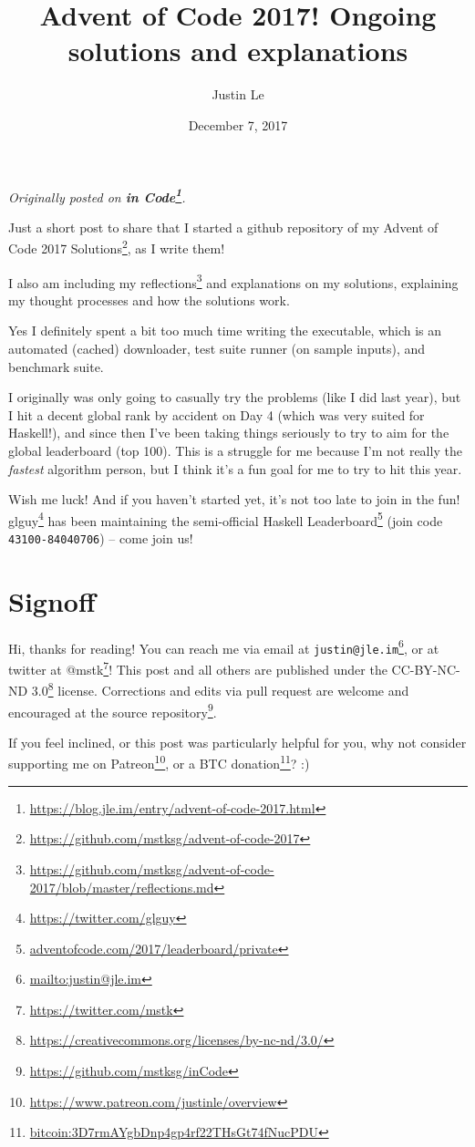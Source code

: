 \documentclass[]{article}
\title{Advent of Code 2017! Ongoing solutions and explanations}
\author{Justin Le}
\date{December 7, 2017}
\renewcommand{\href}[2]{#2\footnote{\url{#1}}}
\begin{document}
\maketitle

\emph{Originally posted on
\textbf{\href{https://blog.jle.im/entry/advent-of-code-2017.html}{in Code}}.}

Just a short post to share that I started a github repository of my
\href{https://github.com/mstksg/advent-of-code-2017}{Advent of Code 2017
Solutions}, as I write them!

I also am including my
\href{https://github.com/mstksg/advent-of-code-2017/blob/master/reflections.md}{reflections}
and explanations on my solutions, explaining my thought processes and how the
solutions work.

Yes I definitely spent a bit too much time writing the executable, which is an
automated (cached) downloader, test suite runner (on sample inputs), and
benchmark suite.

I originally was only going to casually try the problems (like I did last year),
but I hit a decent global rank by accident on Day 4 (which was very suited for
Haskell!), and since then I've been taking things seriously to try to aim for
the global leaderboard (top 100). This is a struggle for me because I'm not
really the \emph{fastest} algorithm person, but I think it's a fun goal for me
to try to hit this year.

Wish me luck! And if you haven't started yet, it's not too late to join in the
fun! \href{https://twitter.com/glguy}{glguy} has been maintaining the
semi-official \href{adventofcode.com/2017/leaderboard/private}{Haskell
Leaderboard} (join code \texttt{43100-84040706}) -- come join us!

\hypertarget{signoff}{%
\section{Signoff}\label{signoff}}

Hi, thanks for reading! You can reach me via email at
\href{mailto:justin@jle.im}{\nolinkurl{justin@jle.im}}, or at twitter at
\href{https://twitter.com/mstk}{@mstk}! This post and all others are published
under the \href{https://creativecommons.org/licenses/by-nc-nd/3.0/}{CC-BY-NC-ND
3.0} license. Corrections and edits via pull request are welcome and encouraged
at \href{https://github.com/mstksg/inCode}{the source repository}.

If you feel inclined, or this post was particularly helpful for you, why not
consider \href{https://www.patreon.com/justinle/overview}{supporting me on
Patreon}, or a \href{bitcoin:3D7rmAYgbDnp4gp4rf22THsGt74fNucPDU}{BTC donation}?
:)
\end{document}
